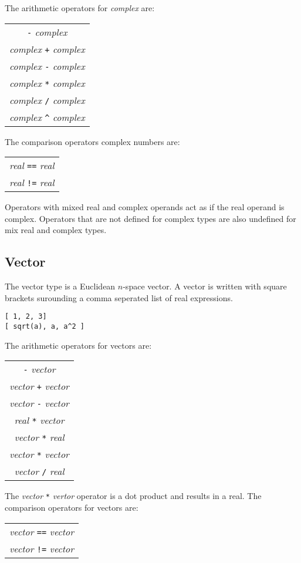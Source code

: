 \documentclass{article}
\begin{document}
The arithmetic operators for \emph{complex} are:
\begin{center}
  \begin{tabular}{c}
    \verb|-| \emph{complex} \\
    \emph{complex} \verb|+| \emph{complex} \\
    \emph{complex} \verb|-| \emph{complex} \\
    \emph{complex} \verb|*| \emph{complex} \\
    \emph{complex} \verb|/| \emph{complex} \\
    \emph{complex} \verb|^| \emph{complex} \\
  \end{tabular}
\end{center}
The comparison operators complex numbers are:
\begin{center}
  \begin{tabular}{c}
    \emph{real} \verb|==| \emph{real} \\
    \emph{real} \verb|!=| \emph{real} \\
  \end{tabular}
\end{center}
Operators with mixed real and complex operands act as if the
real operand is complex.
Operators that are not defined for complex types are also
undefined for mix real and complex types.

\subsection{Vector}
The vector type is a Euclidean $n$-space vector.
A vector is written with square brackets surounding a comma seperated
list of real expressions.
\begin{verbatim}
[ 1, 2, 3]
[ sqrt(a), a, a^2 ]
\end{verbatim}
The arithmetic operators for vectors are:
\begin{center}
  \begin{tabular}{c}
    \verb|-| \emph{vector} \\
    \emph{vector} \verb|+| \emph{vector} \\
    \emph{vector} \verb|-| \emph{vector} \\
    \emph{real} \verb|*| \emph{vector} \\
    \emph{vector} \verb|*| \emph{real} \\
    \emph{vector} \verb|*| \emph{vector} \\
    \emph{vector} \verb|/| \emph{real} \\
  \end{tabular}
\end{center}
The \emph{vector} \verb|*| \emph{vertor} operator is a dot product and results in a real.
The comparison operators for vectors are:
\begin{center}
  \begin{tabular}{c}
    \emph{vector} \verb|==| \emph{vector} \\
    \emph{vector} \verb|!=| \emph{vector} \\
  \end{tabular}
\end{center}
\end{document}

